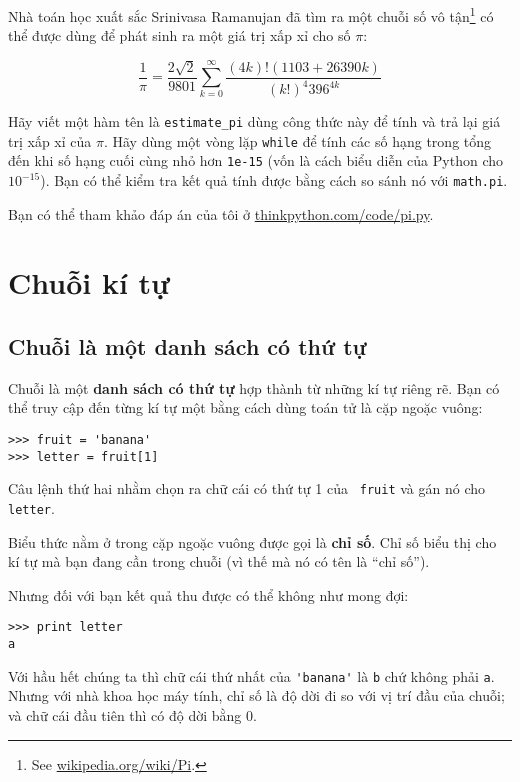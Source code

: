 \documentclass[11pt]{book}
\begin{document}
\begin{ex}


Nhà toán học xuất sắc Srinivasa Ramanujan đã tìm ra một chuỗi số
vô tận\footnote{See \url{wikipedia.org/wiki/Pi}.} có thể được dùng
để phát sinh ra một giá trị xấp xỉ cho số $\pi$:


\[\frac{1}{\pi} = \frac{2\sqrt{2}}{9801} 
\sum^\infty_{k=0} \frac{(4k)!(1103+26390k)}{(k!)^4 396^{4k}} \]

Hãy viết một hàm tên là \verb"estimate_pi" dùng công thức này để
tính và trả lại giá trị xấp xỉ của $\pi$.  Hãy dùng một vòng lặp {\tt while}
để tính các số hạng trong tổng đến khi số hạng cuối cùng nhỏ hơn
{\tt 1e-15} (vốn là cách biểu diễn của Python cho $10^{-15}$).
Bạn có thể kiểm tra kết quả tính được bằng cách so sánh nó với {\tt math.pi}.

Bạn có thể tham khảo đáp án của tôi ở \url{thinkpython.com/code/pi.py}.
\end{ex}


\chapter{Chuỗi kí tự}
\label{chuỗi kí tự}


\section{Chuỗi là một danh sách có thứ tự}

Chuỗi là một {\bf danh sách có thứ tự} hợp thành từ những kí tự riêng rẽ.
Bạn có thể truy cập đến từng kí tự một bằng cách dùng toán tử là cặp
ngoặc vuông:

\beforeverb
\begin{verbatim}
>>> fruit = 'banana'
>>> letter = fruit[1]
\end{verbatim}
\afterverb
%
Câu lệnh thứ hai nhằm chọn ra chữ cái có thứ tự 1 của {\tt
fruit} và gán nó cho {\tt letter}.  


Biểu thức nằm ở trong cặp ngoặc vuông được gọi là {\bf chỉ số}.
Chỉ số biểu thị cho kí tự mà bạn đang cần trong chuỗi (vì thế mà
nó có tên là ``chỉ số''). 

Nhưng đối với bạn kết quả thu được có thể không như mong đợi:

\beforeverb
\begin{verbatim}
>>> print letter
a
\end{verbatim}
\afterverb
%
Với hầu hết chúng ta thì chữ cái thứ nhất của \verb"'banana'" là {\tt b}
chứ không phải {\tt a}. Nhưng với nhà khoa học máy tính, chỉ số là độ
dời đi so với vị trí đầu của chuỗi; và chữ cái đầu tiên thì có độ dời bằng 0.
\end{document}
